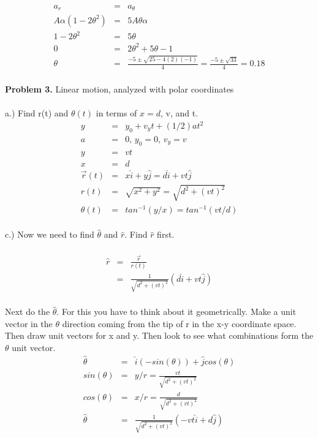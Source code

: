 \documentclass[11pt]{amsart}
\begin{document}
\begin{eqnarray*}
a_{r} &=& a_{\theta} \\
A\alpha(1-2\theta^{2}) &=& 5A\theta\alpha \\ 
1-2\theta^{2} &=& 5\theta \\
0 &=& 2\theta^{2} + 5\theta -1 \\
\theta &=& \frac{-5±\sqrt{25-4(2)(-1)}}{4} = \frac{-5±\sqrt{33}}{4} = 0.18 
\end{eqnarray*} \\






\textbf{Problem 3.} Linear motion, analyzed with polar coordinates \\ \\
a.) Find r(t) and $\theta(t)$ in terms of $x=d$, v, and t. \\
\begin{eqnarray*}
y &=& y_{0} + v_{y}t +(1/2)at^{2} \\
a &=& 0 \mbox{, } y_{0} = 0 \mbox{, } v_{y}=v \\
y &=& vt \\
x &=& d \\
\vec{r}(t) &=& x\hat{i} + y\hat{j} = d\hat{i} + vt\hat{j} \\
r(t) &=& \sqrt{x^{2} + y^{2}} = \sqrt{d^{2} + (vt)^{2}} \\
\theta(t) &=& tan^{-1}(y/x) = tan^{-1}(vt/d) 
\end{eqnarray*} \\
c.) Now we need to find $\hat{\theta}$ and $\hat{r}$. Find $\hat{r}$ first. \\ \\
\begin{eqnarray*}
\hat{r} &=&\frac{\vec{r}}{r(t)} \\
&=& \frac{1}{\sqrt{d^{2}+(vt)^{2}}}(d\hat{i}+vt\hat{j}) 
\end{eqnarray*} \\
Next do the $\hat{\theta}$. For this you have to think about it geometrically. Make a unit vector in the $\theta$ direction coming from the tip of r in the x-y coordinate space. Then draw unit vectors for x and y. Then look to see what combinations form the $\theta$ unit vector. \\
\begin{eqnarray*} 
 \hat{\theta} &=& \hat{i}(-sin(\theta)) + \hat{j}cos(\theta) \\
sin(\theta) &=& y/r = \frac{vt}{\sqrt{d^{2}+(vt)^{2}}} \\
cos(\theta) &=& x/r = \frac{d}{\sqrt{d^{2}+(vt)^{2} }}\\
\hat{\theta} &=& \frac{1}{\sqrt{d^{2}+(vt)^{2}}}(-vt\hat{i}+d\hat{j}) 
\end{eqnarray*} \\
\end{document}
